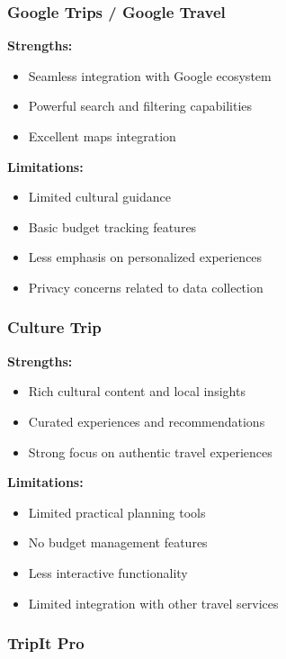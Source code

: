\documentclass[11pt, a4paper]{article}
\begin{document}
\subsubsection{Google Trips / Google Travel}

\textbf{Strengths:}
\begin{itemize}
    \item Seamless integration with Google ecosystem
    \item Powerful search and filtering capabilities
    \item Excellent maps integration
\end{itemize}

\textbf{Limitations:}
\begin{itemize}
    \item Limited cultural guidance
    \item Basic budget tracking features
    \item Less emphasis on personalized experiences
    \item Privacy concerns related to data collection
\end{itemize}

\subsubsection{Culture Trip}

\textbf{Strengths:}
\begin{itemize}
    \item Rich cultural content and local insights
    \item Curated experiences and recommendations
    \item Strong focus on authentic travel experiences
\end{itemize}

\textbf{Limitations:}
\begin{itemize}
    \item Limited practical planning tools
    \item No budget management features
    \item Less interactive functionality
    \item Limited integration with other travel services
\end{itemize}

\subsubsection{TripIt Pro}
\end{document}
